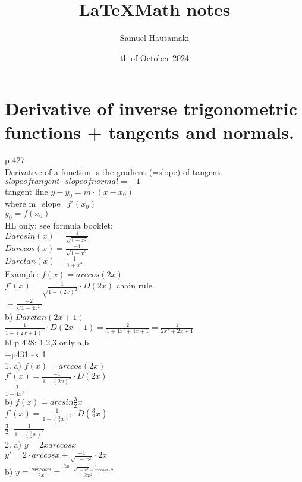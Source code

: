 \documentclass{article}
\title{\LaTeX Math notes}
\author{Samuel Hautamäki}
\date{th of October 2024}
\begin{document}
  \maketitle
   
  \section{Derivative of inverse trigonometric functions + tangents and normals.}
  p 427\\
  Derivative of a function is the gradient (=slope) of tangent.\\ 
  $slope of tangent\cdot slope o fnormal=-1$\\
  tangent line $y-y_0=m\cdot(x-x_0)$\\
  where m=slope=$f'(x_0)$\\
  $y_0=f(x_0)$\\

  HL only: see formula booklet:\\
  $D arcsin (x)=\frac{1}{\sqrt{1-x^2}}$\\
  $D arccos (x)=\frac{-1}{\sqrt{1-x^2}}$\\
  $D arctan (x)=\frac{1}{1+x^2}$\\
  Example: $f(x)=arccos(2x)$\\
  $f'(x)=\frac{-1}{\sqrt{1-(2x)^2}}\cdot D(2x)$ chain rule.\\
  $=\frac{-2}{\sqrt{1-4x^2}}$\\
  b) $D arctan (2x+1)$\\
  $\frac{1}{1+(2x+1)^2}\cdot D (2x+1)=\frac{2}{1+4x^2+4x+1}=\frac{1}{2x^2+2x+1}$\\
  hl p 428: 1,2,3 only a,b\\
  +p431 ex 1\\
  1. a) $f(x)=arccos(2x)$\\
  $f'(x)=\frac{-1}{1-(2x)^2}\cdot D(2x)$\\
  $\frac{-2}{1-4x^2}$\\
  b) $f(x)=arcsin \frac{3}{2}x$\\
  $f'(x)=\frac{1}{1-(\frac{3}{2}x)^2}\cdot D(\frac{3}{2}x)$\\
  $\frac{3}{2}\cdot\frac{1}{1-(\frac{3}{2}x)^2}$\\
  2. a) $y=2x arccos x$\\
  $y'=2\cdot arccos x+\frac{-1}{\sqrt{1-x^2}}\cdot2x$\\
  b) $y=\frac{arccos x}{2x}=\frac{2x\cdot \frac{-1}{\sqrt{1-x^2}-arccos x\cdot 2}}{2x^2}$\\
  

   
\end{document}
